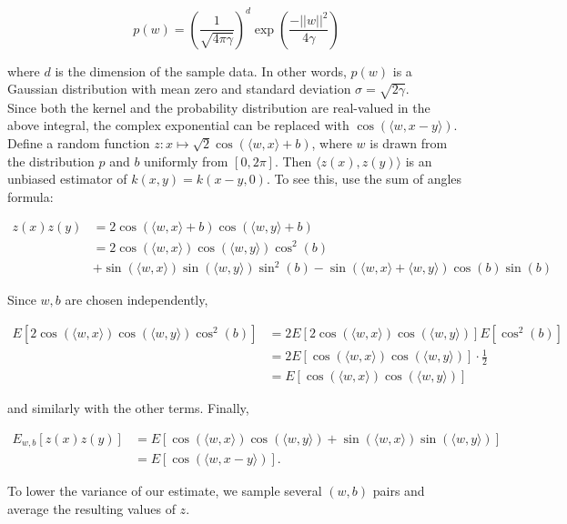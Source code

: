 \[ p(w) = \left(\dfrac{1}{\sqrt{4\pi\gamma}}\right)^d \exp\left(\frac{-||w||^2}{4\gamma}\right)\]

where $d$ is the dimension of the sample data. In other words, $p(w)$ is a Gaussian distribution with mean zero and standard deviation $\sigma = \sqrt{2\gamma}$.\\

 Since both the kernel and the probability distribution are real-valued in the above integral, the complex exponential can be replaced with $\cos(\langle w, x-y\rangle)$. Define a random function $z: x\mapsto \sqrt{2}\cos(\langle w,x\rangle + b)$, where $w$ is drawn from the distribution $p$ and $b$ uniformly from $[0,2\pi]$. Then $\langle z(x),z(y)\rangle$ is an unbiased estimator of $k(x,y)=k(x-y,0)$. To see this, use the sum of angles formula:

\begin{align*}
z(x)z(y) &= 2\cos(\langle w,x\rangle+b)\cos(\langle w,y\rangle+b)\\
			&= 2\cos(\langle w,x\rangle)\cos(\langle w,y\rangle)\cos^2(b) \\
				& +\sin(\langle w, x\rangle)\sin(\langle w, y\rangle)\sin^2(b) - \sin(\langle w, x\rangle+\langle w, y\rangle)\cos(b)\sin(b)
\end{align*}

Since $w,b$ are chosen independently, 

\begin{align*}
E[2\cos(\langle w,x\rangle)\cos(\langle w,y\rangle)\cos^2(b)] &= 2E[2\cos(\langle w,x\rangle)\cos(\langle w,y\rangle)]E[\cos^2(b)]\\
	&= 2E[\cos(\langle w,x\rangle)\cos(\langle w,y\rangle)]\cdot \frac12 \\
	&= E[\cos(\langle w,x\rangle)\cos(\langle w,y\rangle)]
\end{align*}

and similarly with the other terms. Finally,

\begin{align*}
E_{w,b}[z(x)z(y)] &= E[\cos(\langle w,x\rangle)\cos(\langle w,y\rangle) + \sin(\langle w, x\rangle)\sin(\langle w, y\rangle)]\\
						&= E[\cos(\langle w, x-y\rangle)].
\end{align*}



To lower the variance of our estimate, we sample several $(w,b)$ pairs and average the resulting values of $z$.\\







